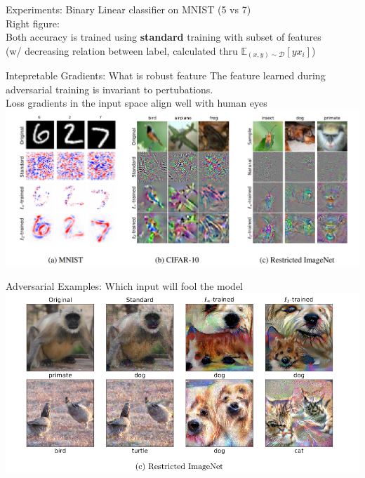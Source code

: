 \documentclass{beamer}
\begin{document}
\begin{frame}{Experiments: Binary Linear classifier on MNIST (5 vs 7)}
  \\
  Right figure: \\Both accuracy is trained using \textbf{standard} training with subset of features \\
(w/ decreasing relation between label, calculated thru $\mathbb{E}_{(x,y) \sim \mathcal{D}}[yx_i]$)
\end{frame}



\begin{frame}{Intepretable Gradients: What is robust feature}
  The feature learned during adversarial training is invariant to pertubations.\\
  Loss gradients in the input space align well with human eyes
  \includegraphics[width=\textwidth]{fig/p2/int-grad.png}
\end{frame}

\begin{frame}{Adversarial Examples: Which input will fool the model}
  \includegraphics[width=\textwidth]{fig/p2/adv-sample.png}
\end{frame}
\end{document}

